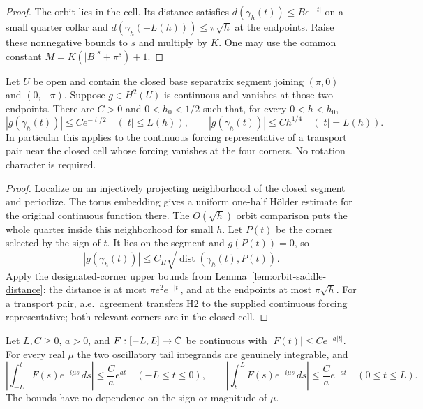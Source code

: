 \begin{proof}
\leanok
The orbit lies in the cell. Its distance satisfies
$d(\gamma_h(t))\le Be^{-|t|}$ on a small quarter collar and
$d(\gamma_h(\pm L(h)))\le\pi\sqrt h$ at the endpoints.
Raise these nonnegative bounds to $s$ and multiply by $K$.
One may use the common constant $M=K(|B|^s+\pi^s)+1$.
\end{proof}

\begin{lemma}
\label{lem:zero-saddle-forcing-decay}
\leanok
Let $U$ be open and contain the closed base separatrix segment joining
$(\pi,0)$ and $(0,-\pi)$. Suppose $g\in H^2(U)$ is continuous and
vanishes at those two endpoints. There are $C>0$ and $0<h_0<1/2$ such
that, for every $0<h<h_0$,
\[
 |g(\gamma_h(t))|\le Ce^{-|t|/2}\quad(|t|\le L(h)),\qquad
 |g(\gamma_h(t))|\le Ch^{1/4}\quad(|t|=L(h)).
\]
In particular this applies to the continuous forcing representative of
a transport pair near the closed cell whose forcing vanishes at the
four corners. No rotation character is required.
\end{lemma}

\begin{proof}
\leanok
Localize on an injectively projecting neighborhood of the closed
segment and periodize. The torus embedding gives a uniform one-half
H\"older estimate for the original continuous function there.
The $O(\sqrt h)$ orbit comparison puts the whole quarter inside this
neighborhood for small $h$.
Let $P(t)$ be the corner selected by the sign of $t$. It lies on the
segment and $g(P(t))=0$, so
\[
 |g(\gamma_h(t))|
 \le C_H\sqrt{\operatorname{dist}(\gamma_h(t),P(t))}.
\]
Apply the designated-corner upper bounds from
Lemma~\ref{lem:orbit-saddle-distance}: the distance is at most
$\pi e^2e^{-|t|}$, and at the endpoints at most $\pi\sqrt h$.
For a transport pair, a.e.\ agreement transfers H2 to the supplied
continuous forcing representative; both relevant corners are in the
closed cell.
\end{proof}

\begin{lemma}
\label{lem:exponential-forcing-tails}
\leanok
Let $L,C\ge0$, $a>0$, and $F:[-L,L]\to\mathbb{C}$ be continuous with
$|F(t)|\le Ce^{-a|t|}$. For every real $\mu$ the two oscillatory tail
integrands are genuinely integrable, and
\[
 \left|\int_{-L}^t F(s)e^{-i\mu s}\,ds\right|
 \le \frac Ca e^{at}\quad(-L\le t\le0),\qquad
 \left|\int_t^L F(s)e^{-i\mu s}\,ds\right|
 \le \frac Ca e^{-at}\quad(0\le t\le L).
\]
The bounds have no dependence on the sign or magnitude of $\mu$.
\end{lemma}

